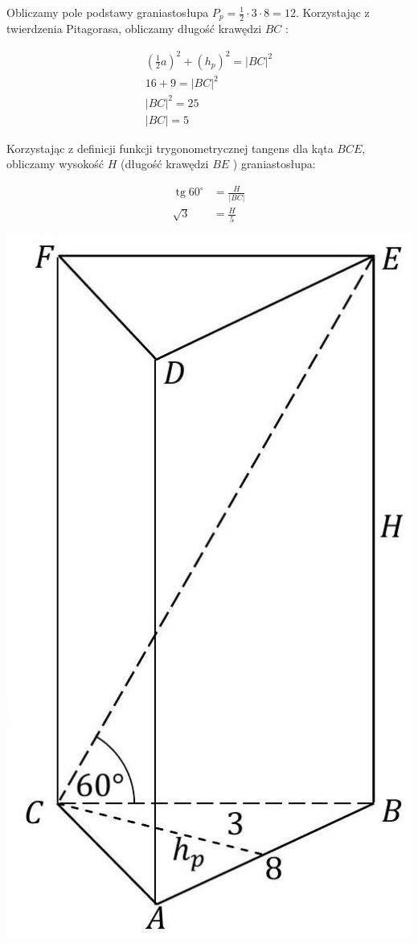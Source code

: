 \documentclass[10pt]{article}
\begin{document}
Obliczamy pole podstawy graniastosłupa $P_{p}=\frac{1}{2} \cdot 3 \cdot 8=12$. Korzystając z twierdzenia Pitagorasa, obliczamy długość krawędzi $B C$ :

$$
\begin{gathered}
\left(\frac{1}{2} a\right)^{2}+\left(h_{p}\right)^{2}=|B C|^{2} \\
16+9=|B C|^{2} \\
|B C|^{2}=25 \\
|B C|=5
\end{gathered}
$$

Korzystając z definicji funkcji trygonometrycznej tangens dla kąta $B C E$, obliczamy wysokość $H$ (długość krawędzi $B E$ ) graniastosłupa:

$$
\begin{aligned}
\operatorname{tg} 60^{\circ} & =\frac{H}{|B C|} \\
\sqrt{3} & =\frac{H}{5}
\end{aligned}
$$

\begin{center}
\includegraphics[max width=\textwidth]{2025_02_07_83b95a6405af75d2626bg-32}
\end{center}
\end{document}
